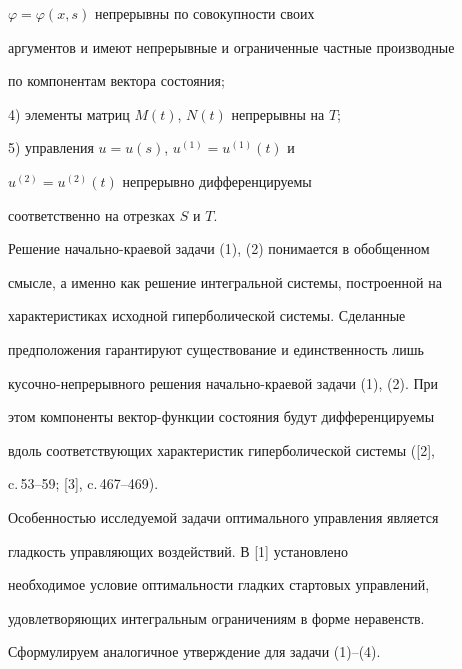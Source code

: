 $\varphi= \varphi (x,s)$ непрерывны по совокупности своих


аргументов и имеют непрерывные и ограниченные частные производные


по компонентам вектора состояния;





4) элементы матриц $M(t)$, $N(t)$ непрерывны на $T$;





5) управления $u=u(s)$,  $u^{(1)}=u^{(1)}(t)$ и


$u^{(2)}=u^{(2)}(t)$ непрерывно дифференцируемы


соответственно на отрезках $S$ и $T$.





Решение начально-краевой задачи (1), (2) понимается в обобщенном


смысле, а именно как решение интегральной системы, построенной на


характеристиках исходной гиперболической системы. Сделанные


предположения гарантируют существование и единственность лишь


кусочно-непрерывного решения начально-краевой задачи (1), (2). При


этом компоненты вектор-функции состояния будут дифференцируемы


вдоль соответствующих характеристик гиперболической системы ([2],


c.\,53--59; [3], c.\,467--469).





Особенностью исследуемой задачи оптимального управления является


гладкость управляющих воздействий. В [1] установлено


необходимое условие оптимальности гладких стартовых управлений,


удовлетворяющих интегральным ограничениям в форме неравенств.


Сформулируем аналогичное утверждение для задачи (1)--(4).






